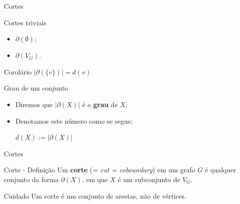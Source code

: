 \documentclass[xcolor=dvipsnames,table]{beamer}
\begin{document}
	\begin{frame}{Cortes}
		\begin{block}{Cortes triviais}
			\begin{itemize}
				\item $\partial( \emptyset )$; \pause
				\item $\partial( V_G )$.
			\end{itemize}
		\end{block} \pause
		\begin{block}{Corolário}
			$|\partial(\{v\})| = d(v)$
		\end{block} \pause
		\begin{block}{Grau de um conjunto}
			\begin{itemize}
				\item Diremos que $|\partial(X)|$ é o {\bf grau} de $X$; \pause
				\item Denotamos este número como se segue:
					\begin{center}
						$d(X) := |\partial(X)|$
					\end{center}
			\end{itemize}
		\end{block}
	\end{frame}
	
	\begin{frame}{Cortes}
		\begin{block}{Corte - Definição}
			Um {\bf corte} ({\it = cut = coboundary}) em um grafo $G$ é qualquer conjunto da forma $\partial(X)$, em que $X$ é um subconjunto de $V_G$.
		\end{block} \pause
		\begin{alertblock}{Cuidado}
			Um corte é um conjunto de arestas, não de vértices.
		\end{alertblock}
	\end{frame}
	
	\begin{frame}
		\titlepage
	\end{frame}
	
\end{document}
